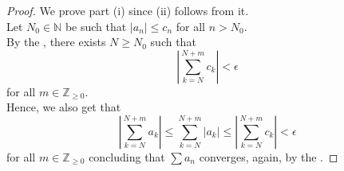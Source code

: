 \comptest*\label{thm:comptest2}
\begin{flushright}\hyperref[thm:comptest]{\upsym}\end{flushright}
\begin{proof}
	We prove part (i) since (ii) follows from it.\\
	Let $N_0 \in \mathbb{N}$ be such that $|a_n| \le c_n$ for all $n > N_0.$\\
	By the , there exists $N \ge N_0$ such that
	\begin{equation*} 
		\left|\sum_{k=N}^{N+m}c_k\right| < \epsilon 
	\end{equation*}
	for all $m \in \mathbb{Z}_{\ge0}.$\\
	Hence, we also get that
	\begin{equation*} 
		\left|\sum_{k=N}^{N+m}a_k\right| \le \sum_{k=N}^{N+m}|a_k| \le \left|\sum_{k=N}^{N+m}c_k\right| < \epsilon 
	\end{equation*}
	for all $m \in \mathbb{Z}_{\ge0}$ concluding that $\sum a_n$ converges, again, by the .
\end{proof}

